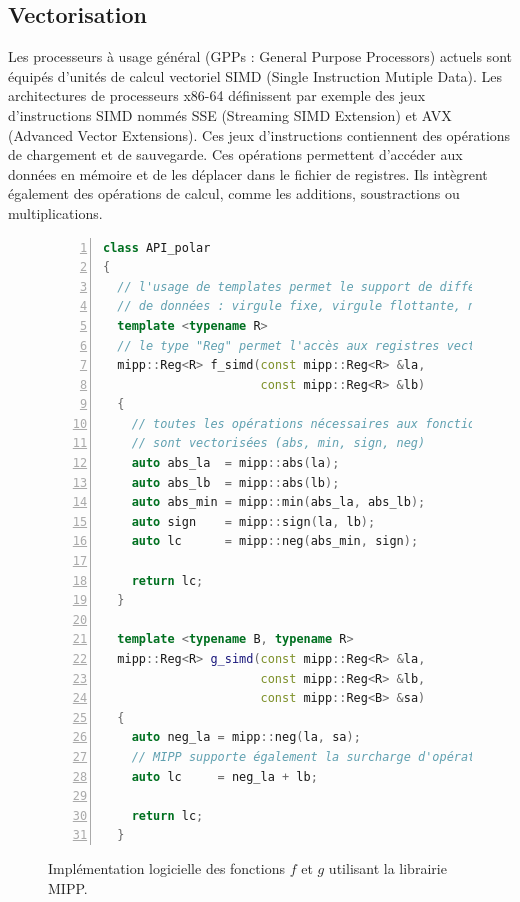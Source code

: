 \subsection{Vectorisation}


Les processeurs à usage général (GPPs : General Purpose Processors) actuels sont équipés d'unités de calcul vectoriel SIMD (Single Instruction Mutiple Data). Les architectures de processeurs x86-64 définissent par exemple des jeux d'instructions SIMD nommés SSE (Streaming SIMD Extension) et AVX (Advanced Vector Extensions). Ces jeux d'instructions contiennent des opérations de chargement et de sauvegarde. Ces opérations permettent d'accéder aux données en mémoire et de les déplacer dans le fichier de registres. Ils intègrent également des opérations de calcul, comme les additions, soustractions ou multiplications.
\begin{figure}[htp]
\begin{lstlisting}[language=C++, numbers=left, numbersep=0.3em, tabsize=2, basicstyle=\footnotesize\ttfamily]
class API_polar
{
  // l'usage de templates permet le support de différents formats
  // de données : virgule fixe, virgule flottante, nombre de bits
  template <typename R>
  // le type "Reg" permet l'accès aux registres vectoriels
  mipp::Reg<R> f_simd(const mipp::Reg<R> &la,
                      const mipp::Reg<R> &lb)
  {
    // toutes les opérations nécessaires aux fonctions polaires
    // sont vectorisées (abs, min, sign, neg)
    auto abs_la  = mipp::abs(la);
    auto abs_lb  = mipp::abs(lb);
    auto abs_min = mipp::min(abs_la, abs_lb);
    auto sign    = mipp::sign(la, lb);
    auto lc      = mipp::neg(abs_min, sign);

    return lc;
  }

  template <typename B, typename R>
  mipp::Reg<R> g_simd(const mipp::Reg<R> &la,
                      const mipp::Reg<R> &lb,
                      const mipp::Reg<B> &sa)
  {
    auto neg_la = mipp::neg(la, sa);
    // MIPP supporte également la surcharge d'opérateurs
    auto lc     = neg_la + lb;

    return lc;
  }

  \end{lstlisting}
  \caption{Implémentation logicielle des fonctions $f$ et $g$ utilisant la librairie MIPP.}
  \label{fig:mipp}
  \end{figure}

